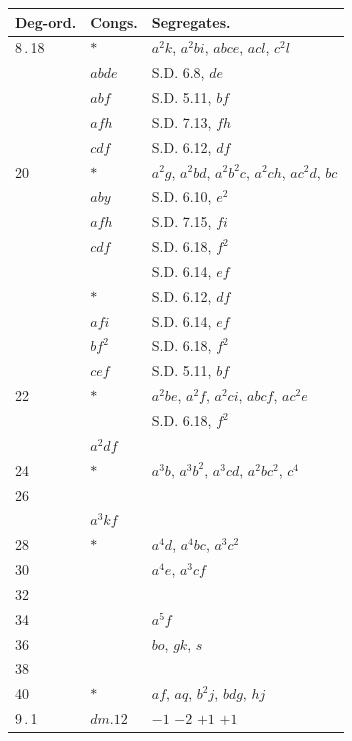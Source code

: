 \documentclass[11pt]{article}
\begin{document}
\begin{center}
\begin{tabular}{lll}
Deg-ord. & Congs. & Segregates. \\
\hline
8\,.\,18 & $*$ & $a^{2}k$, $a^{2}bi$, $abce$, $acl$, $c^{2}l$ \\
& $abde$ & \quad\quad\quad\quad\quad\quad S.D. 6.8, $de$ \\
& $abf$ & \quad\quad\quad\quad\quad\quad S.D. 5.11, $bf$ \\
& $af h$ & \quad\quad\quad\quad\quad\quad S.D. 7.13, $fh$ \\
& $cdf$ & \quad\quad\quad\quad\quad\quad S.D. 6.12, $df$ \\
20 & $*$ & $a^{2}g$, $a^{2}bd$, $a^{2}b^{2}c$, $a^{2}ch$, $ac^{2}d$, $bc$ \\
& $aby$ & \quad\quad\quad\quad\quad\quad S.D. 6.10, $e^{2}$ \\
& $afh$ & \quad\quad\quad\quad\quad\quad S.D. 7.15, $fi$ \\
& $cdf$ & \quad\quad\quad\quad\quad\quad S.D. 6.18, $f^{2}$ \\
& & \quad\quad\quad\quad\quad\quad S.D. 6.14, $ef$ \\
& $*$ & \quad\quad\quad\quad\quad\quad S.D. 6.12, $df$ \\
& $afi$ & \quad\quad\quad\quad\quad\quad S.D. 6.14, $ef$ \\
& $bf^{2}$ & \quad\quad\quad\quad\quad\quad S.D. 6.18, $f^{2}$ \\
& $cef$ & \quad\quad\quad\quad\quad\quad S.D. 5.11, $bf$ \\
22 & $*$ & $a^{2}be$, $a^{2}f$, $a^{2}ci$, $abcf$, $ac^{2}e$ \\
& & \quad\quad\quad\quad\quad\quad S.D. 6.18, $f^{2}$ \\
& $a^{2}df$ & \\
24 & $*$ & $a^{3}b$, $a^{3}b^{2}$, $a^{3}cd$, $a^{2}bc^{2}$, $c^{4}$ \\
26 & & \\
& $a^{3}kf$ & \\
28 & $*$ & $a^{4}d$, $a^{4}bc$, $a^{3}c^{2}$ \\
30 & & $a^{4}e$, $a^{3}cf$ \\
32 & & \\
34 & & $a^{5}f$ \\
36 & & $bo$, $gk$, $s$ \\
38 & & \\
40 & $*$ & $af$, $aq$, $b^{2}j$, $bdg$, $hj$ \\
\hline
9\,.\,1 & $dm.12$ & \quad $-1$ $-2$ $+1$ $+1$ \\

\end{tabular}
\end{center}
\end{document}
